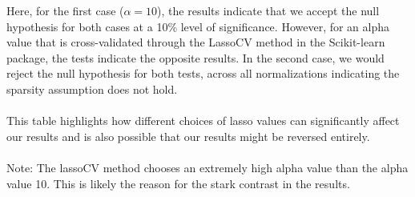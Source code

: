 Here, for the first case ($\alpha = 10$), the results indicate that we accept the null hypothesis for both cases at a 10\% level of significance. However, for an alpha value that is cross-validated through the LassoCV method in the Scikit-learn package, the tests indicate the opposite results. In the second case, we would reject the null hypothesis for both tests, across all normalizations indicating the sparsity assumption does not hold.\\ 
\\
This table highlights how different choices of lasso values can significantly affect our results and is also possible that our results might be reversed entirely. \\
\\
Note: The lassoCV method chooses an extremely high alpha value than the alpha value 10. This is likely the reason for the stark contrast in the results. 